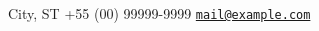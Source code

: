 \documentclass[a4paper]{article}
\makeatletter
\newcommand{\myphone}{+55 (00) 99999-9999}
\newcommand{\myemail}{\href{mailto:mail@example.com}{\texttt{mail@example.com}}}
\newcommand{\mycity}{City, ST}
\makeatother
\begin{document}
\begin{paracol}{2}
\vspace{2em}

\newlength{\rightcolwidth}
\setlength{\rightcolwidth}{0.75\textwidth}
\begin{minipage}[t]{\rightcolwidth}
\begin{center}\fontfamily{\sfdefault}\selectfont \color{black!70}
{\small
 \mycity \;\;
 \myphone \;\;
 \myemail
}
\end{center}
\end{minipage}



\end{paracol}
\end{document}
